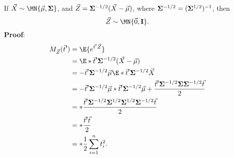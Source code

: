 \begin{Remark}{}{}
    If $ \Vector{X}\sim \MN{\Vector{\mu},\Matrix{\Sigma}} $, and
    $ \vec{Z}=\mathbf{\Sigma}^{-1/2}(\vec{X}-\vec{\mu}) $,
    where $ \mathbf{\Sigma}^{-1/2}=(\mathbf{\Sigma}^{1/2})^{-1} $, then
    \[ \Vector{Z} \sim \MN{\Vector{0},\Matrix{I}}. \]
    \tcblower{}
    \textbf{Proof}:
    \begin{align*}
        M_{\Vector{Z}}(\Vector{t}')
         & =\E{e^{\Vector{t}'\Vector{Z}}}                                                                                                                                                                       \\
         & =\E*{\exp{\Vector{t}'\Matrix{\Sigma}^{-1/2}(\Vector{X}-\Vector{\mu})}}                                                                                                                               \\
         & =\exp{-\Vector{t}'\Matrix{\Sigma}^{-1/2}\Vector{\mu}}\E*{\exp{\Vector{t}'\Matrix{\Sigma}^{-1/2}\Vector{X}}}                                                                                          \\
         & =\exp{-\Vector{t}'\Matrix{\Sigma}^{-1/2}\Vector{\mu}}\exp*{\Vector{t}'\Matrix{\Sigma}^{-1/2}\Vector{\mu}+\frac{\Vector{t}'\Matrix{\Sigma}^{-1/2}\Matrix{\Sigma}\Matrix{\Sigma}^{-1/2}\Vector{t}}{2}} \\
         & =\exp*{\frac{\Vector{t}'\Matrix{\Sigma}^{-1/2}\Matrix{\Sigma}^{1/2}\Matrix{\Sigma}^{1/2}\Matrix{\Sigma}^{-1/2}\Vector{t}}{2}}                                                                        \\
         & =\exp*{\frac{\Vector{t}'\Vector{t}}{2}}                                                                                                                                                              \\
         & =\exp*{\frac{1}{2}\sum_{i=1}^{n}t_i^2}.
    \end{align*}
\end{Remark}
